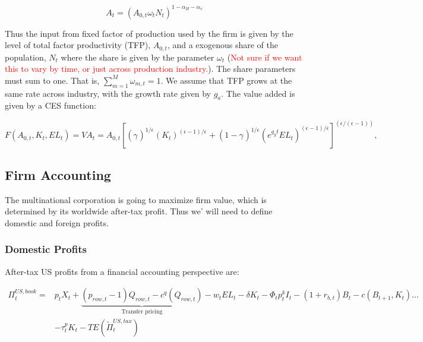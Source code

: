 \begin{equation}
A_{t} = (A_{0,t}\omega_{t}N_{t})^{1-\alpha_{H}-\alpha_{v}}
\end{equation}

\noindent\noindent Thus the input from fixed factor of production used by the firm is given by the level of total factor productivity (TFP), $A_{0,t}$, and a exogenous share of the population, $N_{t}$ where the share is given by the parameter $\omega_{t}$ (\textcolor{red}{Not sure if we want this to vary by time, or just across production industry.}).  The share parameters must sum to one.  That is, $\sum_{m=1}^{M} \omega_{m,t} = 1$.     We assume that TFP grows at the same rate across industry, with the growth rate given by $g_{a}$.  The value added is given by a CES function:

\begin{equation}
\label{eqn:prod_fun}
F(A_{0,t},K_{t},EL_{t})=VA_{t} =A_{0,t} \left[(\gamma_{})^{1/\epsilon_{}}(K_{t})^{(\epsilon-1)/\epsilon_{}}+(1-\gamma_{})^{1/\epsilon_{}}(e^{g_{y}t}EL_{t})^{(\epsilon_{}-1)/\epsilon_{}}\right]^{(\epsilon_{}/(\epsilon_{}-1))},
\end{equation}

\subsection{Firm Accounting}

The multinational corporation is going to maximize firm value, which is determined by its worldwide after-tax profit.  Thus we' will need to define domestic and foreign profits.

\subsubsection{Domestic Profits}

After-tax US profits from a financial accounting perspective are:

\begin{equation}
\label{eqn:profit_book_mnc_us}
\begin{split}
\Pi^{US,book}_{t} = & p_{t}X_{t}+\underbrace{(p_{row,t}-1)Q_{row,t}-c^{q}(Q_{row,t})}_{\text{Transfer pricing}}-w_{t}EL_{t}-\delta K_{t} -\Phi_{t}p^{k}_{t}I_{t}-(1+r_{b,t})B_{t}- c(B_{t+1},K_{t})...\\
& -\tau^{p}_{t}K_{t}-TE(\tilde{\Pi}^{US, tax}_{t})
\end{split}
\end{equation}

